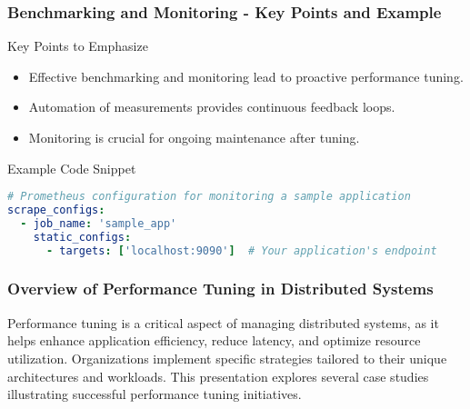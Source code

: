 \documentclass{beamer}
\begin{document}
\begin{frame}[fragile]
    \frametitle{Benchmarking and Monitoring - Key Points and Example}
    \begin{block}{Key Points to Emphasize}
        \begin{itemize}
            \item Effective benchmarking and monitoring lead to proactive performance tuning.
            \item Automation of measurements provides continuous feedback loops.
            \item Monitoring is crucial for ongoing maintenance after tuning.
        \end{itemize}
    \end{block}

    \begin{block}{Example Code Snippet}
        \begin{lstlisting}[language=yaml]
# Prometheus configuration for monitoring a sample application
scrape_configs:
  - job_name: 'sample_app'
    static_configs:
      - targets: ['localhost:9090']  # Your application's endpoint
        \end{lstlisting}
    \end{block}
\end{frame}

\begin{frame}[fragile]
    \frametitle{Overview of Performance Tuning in Distributed Systems}
    Performance tuning is a critical aspect of managing distributed systems, as it helps enhance application efficiency, reduce latency, and optimize resource utilization. Organizations implement specific strategies tailored to their unique architectures and workloads. This presentation explores several case studies illustrating successful performance tuning initiatives.
\end{frame}
\end{document}
